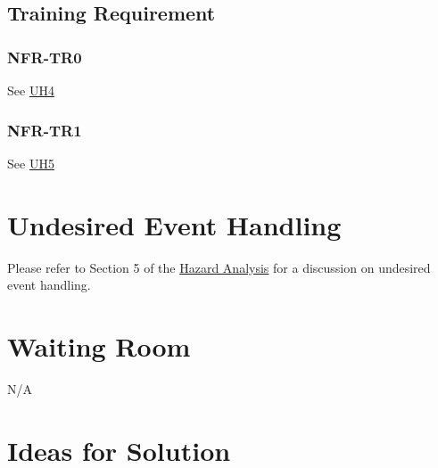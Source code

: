 \documentclass[12pt]{article}
\begin{document}
\subsection{Training Requirement}


\subsubsection*{NFR-TR0}
        \label{sec:TR0}
        See \hyperref[sec:UH4]{UH4}
        \subsubsection*{NFR-TR1}
        \label{sec:TR1}
        See \hyperref[sec:UH4]{UH5}


\section{Undesired Event Handling}
Please refer to Section 5 of the \href{https://github.com/OKKM-insights/OKKM.insights/blob/main/docs/HazardAnalysis/HazardAnalysis.pdf}{Hazard Analysis} for a discussion on undesired event handling.

\section{Waiting Room}
N/A

\section{Ideas for Solution}
\end{document}
